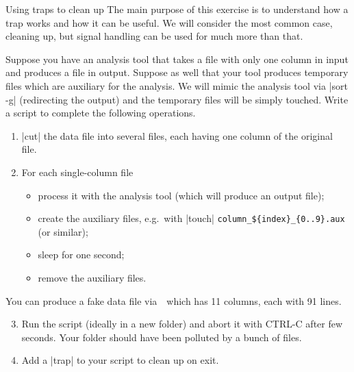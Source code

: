 
\begin{exercise}[Inspirational]{Using traps to clean up}
    The main purpose of this exercise is to understand how a trap works and how it can be useful.
    We will consider the most common case, cleaning up, but signal handling can be used for much more than that.
    
    Suppose you have an analysis tool that takes a file with only one column in input and produces a file in output.
    Suppose as well that your tool produces temporary files which are auxiliary for the analysis.
    We will mimic the analysis tool via \bash|sort -g| (redirecting the output) and the temporary files will be simply touched.
    Write a script to complete the following operations.
    \begin{enumerate}
        \item \bash|cut| the data file into several files, each having one column of the original file.
        \item For each single-column file
              \begin{itemize}
                  \item process it with the analysis tool (which will produce an output file);
                  \item create the auxiliary files, e.g.\ with \bash|touch| \texttt{column\_\$\{index\}\_\{0..9\}.aux} (or similar);
                  \item sleep for one second;
                  \item remove the auxiliary files.
              \end{itemize}
    \end{enumerate}
    You can produce a fake data file via \,\, which has 11 columns, each with 91 lines.
    \begin{enumerate}
        \setcounter{enumi}{2}
        \item Run the script (ideally in a new folder) and abort it with CTRL-C after few seconds.
              Your folder should have been polluted by a bunch of files.
        \item Add a \bash|trap| to your script to clean up on exit.
    \end{enumerate}
\end{exercise}